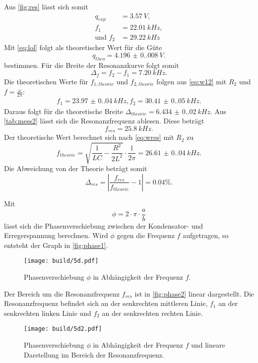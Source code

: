 Aus \autoref{fig:res} lässt sich somit
\begin{align*}
  q_{exp} &= \SI{3.57}{V}, \\
  f_1 &= \SI{22.01}{kHz}, \\
  \text{und } f_2 &= \SI{29.22}{kHz}
\end{align*}
Mit \autoref{eq:lol} folgt als theoretischer Wert für die Güte
\begin{equation}
  q_{theo} = \SI{4.196(0.008)}{V}.
\end{equation}
bestimmen. Für die Breite der Resonanzkurve folgt somit
\begin{equation*}
  \Delta_f = f_2 - f_1 = \SI{7.20}{kHz}.
\end{equation*}
\newpage
Die theoretischen Werte für $f_{1, theorie}$ und $f_{2, theorie}$ folgen aus \autoref{eq:w12} mit $R_2$ und $f = \frac{\omega}{2\pi}$:
\begin{align*}
  f_1 = \SI{23.97(0.04)}{kHz},
  f_2 = \SI{30.41(0.05)}{kHz}.
\end{align*}
Daraus folgt für die theoretische Breite $\Delta_{theorie} = \SI{6.434(0.020)}{kHz}$.
Aus \autoref{tab:mess2} lässt sich die Resonanzfrequenz ablesen. Diese beträgt
\begin{equation*}
  f_{res} = \SI{25.8}{kHz}.
\end{equation*}
Der theoretische Wert berechnet sich nach \autoref{eq:wres} mit $R_2$ zu 
\begin{equation*}
  f_{theorie} = \sqrt{\frac{1}{LC} - \frac{R^2}{2L^2}} \cdot \frac{1}{2\pi} = \SI{26.61(0.04)}{kHz}.
\end{equation*}
Die Abweichung von der Theorie beträgt somit 
\begin{equation*}
  \Delta_{res} = |\frac{f_{res}}{f_{theorie}} - 1| = 0.04\%.
\end{equation*}

Mit 
\begin{equation*}
  \phi = 2 \cdot \pi \cdot \frac{a}{b}
\end{equation*}
lässt sich die Phasenverschiebung zwischen der Kondensator- und Erregerspannung berechnen.
Wird $\phi$ gegen die Frequenz $f$ aufgetragen, so entsteht der Graph in \autoref{fig:phase1}.
\begin{figure}[H]
  \texttt{[image: build/5d.pdf]}
  \caption{Phasenverschiebung $\phi$ in Abhängigkeit der Frequenz $f$.}
  \label{fig:phase1}
\end{figure}
Der Bereich um die Resonanzfrequenz $f_{res}$ ist in \autoref{fig:phase2} linear dargestellt. Die Resonanzfrequenz befindet sich an der senkrechten
mittleren Linie, $f_1$ an der senkrechten linken Linie und $f_2$ an der senkrechten rechten Linie.
\begin{figure}[H]
  \texttt{[image: build/5d2.pdf]}
  \caption{Phasenverschiebung $\phi$ in Abhängigkeit der Frequenz $f$ und lineare Darstellung im Bereich der Resonanzfrequenz.}
  \label{fig:phase2}
\end{figure}







\newpage
